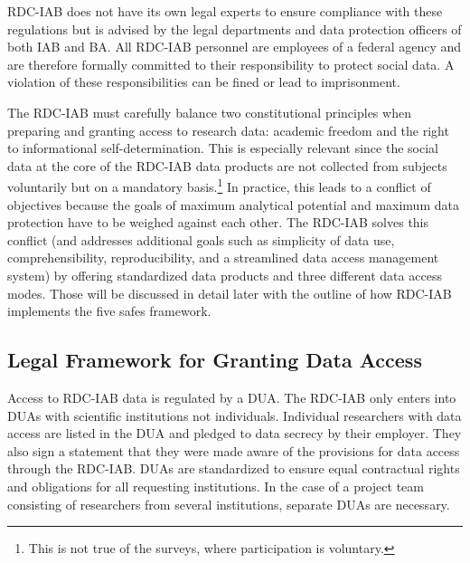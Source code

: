 RDC-IAB does not have its own legal experts to ensure compliance with these regulations but is advised by the legal departments and data protection officers of both IAB and BA. All RDC-IAB personnel are employees of a federal agency and are therefore formally committed to their responsibility to protect social data. A violation of these responsibilities can be fined or lead to imprisonment.

The RDC-IAB must carefully balance two constitutional principles when preparing and granting access to research data: academic freedom and the right to informational self-determination. This is especially relevant since the social data at the core of the RDC-IAB data products are not collected from subjects voluntarily but on a mandatory basis.\footnote{This is not true of the surveys, where participation is voluntary.} In practice, this leads to a conflict of objectives because the goals of maximum analytical potential and maximum data protection have to be weighed against each other. The RDC-IAB solves this conflict (and addresses additional goals such as simplicity of data use, comprehensibility, reproducibility, and a streamlined data access management system) by offering standardized data products and three different data access modes. Those will be discussed in detail later with the outline of how RDC-IAB implements the five safes framework.

\hypertarget{legal-framework-for-granting-data-access}{%
\subsection{Legal Framework for Granting Data Access}\label{legal-framework-for-granting-data-access}}

Access to RDC-IAB data is regulated by a DUA. The RDC-IAB only enters into DUAs with scientific institutions not individuals. Individual researchers with data access are listed in the DUA and pledged to data secrecy by their employer. They also sign a statement that they were made aware of the provisions for data access through the RDC-IAB. DUAs are standardized to ensure equal contractual rights and obligations for all requesting institutions. In the case of a project team consisting of researchers from several institutions, separate DUAs are necessary.

